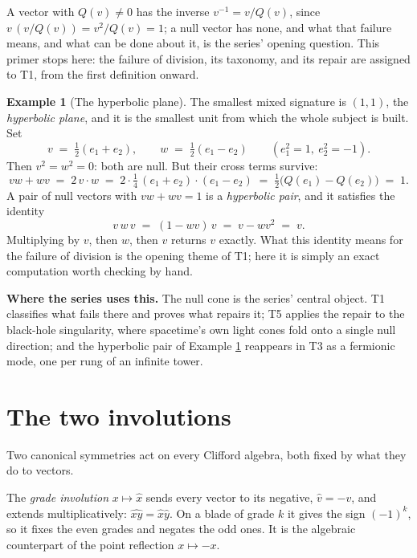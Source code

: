 \documentclass[11pt]{article}
\theoremstyle{definition}
\newtheorem{example}[theorem]{Example}
\theoremstyle{plain}
\begin{document}
A vector with $Q(v) \neq 0$ has the inverse $v^{-1} = v / Q(v)$, since $v\,(v/Q(v)) = v^2/Q(v) = 1$; a null vector has none, and what that failure means, and what can be done about it, is the series' opening question. This primer stops here: the failure of division, its taxonomy, and its repair are assigned to T1, from the first definition onward.

\begin{example}[The hyperbolic plane]\label{c:note.primer.hyperbolic-plane}
The smallest mixed signature is $(1,1)$, the \emph{hyperbolic plane}, and it is the smallest unit from which the whole subject is built. Set
\[
v \;=\; \tfrac12 (e_1 + e_2), \qquad w \;=\; \tfrac12 (e_1 - e_2) \qquad (e_1^2 = 1,\ e_2^2 = -1).
\]
Then $v^{2} = w^{2} = 0$: both are null. But their cross terms survive:
\[
vw + wv \;=\; 2\, v\cdot w \;=\; 2\cdot\tfrac14\,(e_1 + e_2)\cdot(e_1 - e_2) \;=\; \tfrac12\bigl(Q(e_1) - Q(e_2)\bigr) \;=\; 1 .
\]
A pair of null vectors with $vw + wv = 1$ is a \emph{hyperbolic pair}, and it satisfies the identity
\[
v\,w\,v \;=\; (1 - wv)\,v \;=\; v - w v^2 \;=\; v .
\]
Multiplying by $v$, then $w$, then $v$ returns $v$ exactly. What this identity means for the failure of division is the opening theme of T1; here it is simply an exact computation worth checking by hand.
\end{example}

\label{c:note.primer.setting-signature-arrival-null-vectors-2}
\textbf{Where the series uses this.} The null cone is the series' central object. T1 classifies what fails there and proves what repairs it; T5 applies the repair to the black-hole singularity, where spacetime's own light cones fold onto a single null direction; and the hyperbolic pair of Example \ref{c:note.primer.hyperbolic-plane} reappears in T3 as a fermionic mode, one per rung of an infinite tower.

\section{The two involutions}

\label{c:note.primer.setting-two-involutions}
Two canonical symmetries act on every Clifford algebra, both fixed by what they do to vectors.

The \emph{grade involution} $x \mapsto \hat{x}$ sends every vector to its negative, $\hat{v} = -v$, and extends multiplicatively: $\widehat{xy} = \hat{x}\hat{y}$. On a blade of grade $k$ it gives the sign $(-1)^{k}$, so it fixes the even grades and negates the odd ones. It is the algebraic counterpart of the point reflection $x \mapsto -x$.
\end{document}
